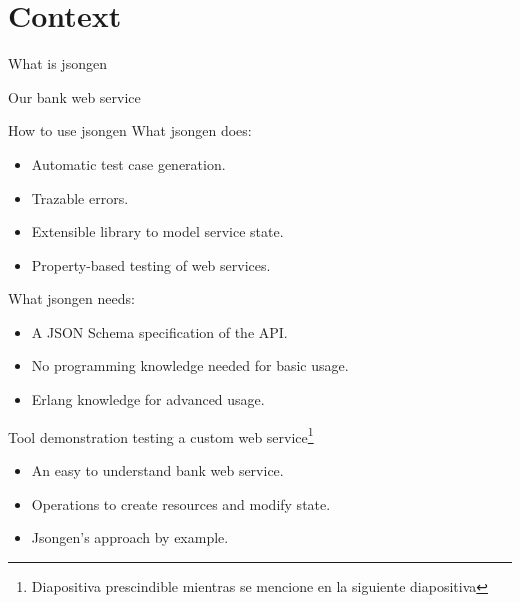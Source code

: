 \section{Context}

\begin{frame}{What is jsongen}

\end{frame}

\begin{frame}{Our bank web service}
  \begin{figure}
    \centering
      \begin{overprint}[\textwidth]
  \end{overprint}
  \end{figure}
\end{frame}

\begin{frame}{How to use jsongen}
  What jsongen does:
\begin{itemize}
\item Automatic test case generation.
\item Trazable errors.
\item Extensible library to model service state.
\item Property-based testing of web services.
\end{itemize}

What jsongen needs:
  \begin{itemize}
    \item A JSON Schema specification of the API.
    \item No programming knowledge needed for basic usage.
    \item Erlang knowledge for advanced usage.
  \end{itemize}
\end{frame}

\begin{frame}{Tool demonstration testing a custom web
    service\footnote{Diapositiva prescindible mientras se mencione en la siguiente
    diapositiva}}
  \begin{itemize}
  \item An easy to understand bank web service.
  \item Operations to create resources and modify state.
  \item Jsongen's approach by example.
  \end{itemize}
\end{frame}